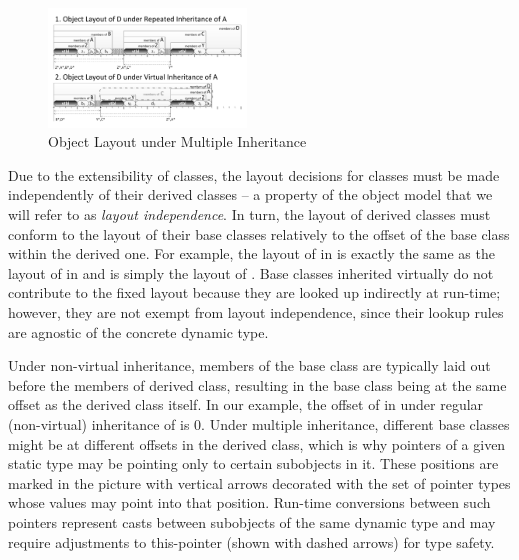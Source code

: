 \begin{figure}[htbp]
  \centering
    \includegraphics[width=0.47\textwidth]{obj-layout.pdf}
  \caption{Object Layout under Multiple Inheritance}
  \label{fig:objlayout}
\end{figure}

Due to the extensibility of classes, the layout decisions for classes must be 
made independently of their derived classes -- a property of the \Cpp{} object 
model that we will refer to as \emph{layout independence}. In turn, the layout of derived   
classes must conform to the layout of their base classes relatively to the offset 
of the base class within the derived one. For example, the layout of  in 
 is exactly the same as the layout of  in  and is simply
the layout of . Base classes inherited virtually do not contribute to 
the fixed layout because they are looked up indirectly at run-time; however, 
they are not exempt from layout independence, since their lookup rules are 
agnostic of the concrete dynamic type.

Under non-virtual inheritance, members of the base class are typically laid out 
before the members of derived class, resulting in the base class being at the 
same offset as the derived class itself. In our example, the offset of  
in  under regular (non-virtual) inheritance of  is 0.
Under multiple inheritance, different base classes might be at different offsets 
in the derived class, which is why pointers of a given static type may be 
pointing only to certain subobjects in it. These positions are marked in the 
picture with vertical arrows decorated with the set of pointer types whose 
values may point into that position. Run-time conversions between such pointers 
represent casts between subobjects of the same dynamic type and may require 
adjustments to this-pointer (shown with dashed arrows) for type safety.

